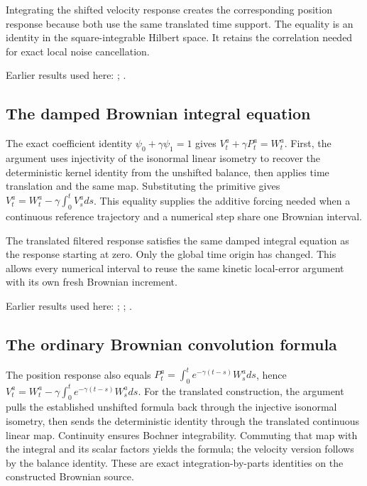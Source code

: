 \documentclass[11pt,a4paper]{report}
\begin{document}
Integrating the shifted velocity response creates the corresponding position response because both use the same translated time support. The equality is an identity in the square-integrable Hilbert space. It retains the correlation needed for exact local noise cancellation.



Earlier results used here: \cite[Section~3.6.12]{LangevinLean2026ULASC}; \cite[Section~3.8.5]{LangevinLean2026ULASC}.
\subsection{\texorpdfstring{The damped Brownian integral equation}{The damped Brownian integral equation}}
\label{report-step-KineticLangevin-BrownianSegmentEquations-lean-3}


The exact coefficient identity \(\psi_0+\gamma\psi_1=1\) gives \(V^a_t+\gamma P^a_t=W^a_t\). First, the argument uses injectivity of the isonormal linear isometry to recover the deterministic kernel identity from the unshifted balance, then applies time translation and the same map. Substituting the primitive gives \(V^a_t=W^a_t-\gamma\int_0^tV^a_sds\). This equality supplies the additive forcing needed when a continuous reference trajectory and a numerical step share one Brownian interval.



The translated filtered response satisfies the same damped integral equation as the response starting at zero. Only the global time origin has changed. This allows every numerical interval to reuse the same kinetic local-error argument with its own fresh Brownian increment.



Earlier results used here: \cite[Section~3.6.12]{LangevinLean2026ULASC}; \cite[Section~3.8.5]{LangevinLean2026ULASC}; \cite[Section~3.8.9]{LangevinLean2026ULASC}.
\subsection{\texorpdfstring{The ordinary Brownian convolution formula}{The ordinary Brownian convolution formula}}
\label{report-step-KineticLangevin-BrownianSegmentEquations-lean-4}


The position response also equals \(P^a_t=\int_0^te^{-\gamma(t-s)}W^a_sds\), hence \(V^a_t=W^a_t-\gamma\int_0^te^{-\gamma(t-s)}W^a_sds\). For the translated construction, the argument pulls the established unshifted formula back through the injective isonormal isometry, then sends the deterministic identity through the translated continuous linear map. Continuity ensures Bochner integrability. Commuting that map with the integral and its scalar factors yields the formula; the velocity version follows by the balance identity. These are exact integration-by-parts identities on the constructed Brownian source.
\end{document}

